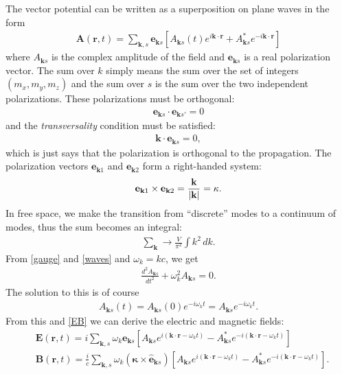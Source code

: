 \documentclass{book}
\theoremstyle{definition}
\newcommand{\f}[2]{\frac{#1}{#2}}
\newcommand{\lb}{\left[}
\newcommand{\rb}{\right]}
\begin{document}
The vector potential can be written as a superposition on plane waves in the form
\begin{align}
\mathbf{A}(\mathbf{r},t) = \sum_{\mathbf{k},s}\mathbf{e}_{\mathbf{k}s} \lb A_{\mathbf{k}s}(t)e^{i\mathbf{k}\cdot\mathbf{r}} + A_{\mathbf{k}s}^* e^{-i\mathbf{k}\cdot \mathbf{r}} \rb 
\end{align}
where $A_{\mathbf{k}s}$ is the complex amplitude of the field and $\mathbf{e}_{\mathbf{k}s}$ is a real polarization vector. The sum over $k$ simply means the sum over the set of integers $(m_x , m_y , m_z)$ and the sum over $s$ is the sum over the two independent polarizations. These polarizations must be orthogonal:
\begin{align}
\mathbf{e}_{\mathbf{k}s} \cdot \mathbf{e}_{\mathbf{k}s'} = 0
\end{align}
and the \textit{transversality} condition must be satisfied:
\begin{align}
\mathbf{k}\cdot\mathbf{e}_{\mathbf{k}s} = 0,
\end{align}
which is just says that the polarization is orthogonal to the propagation. The polarization vectors $\mathbf{e}_{\mathbf{k}1}$ and $\mathbf{e}_{\mathbf{k}2}$ form a right-handed system:
\begin{align}
\mathbf{e}_{\mathbf{k}1}\times \mathbf{e}_{\mathbf{k}2} = \f{\mathbf{k}}{\abs{\mathbf{k}}} = \mathbf{\kappa}.
\end{align}
In free space, we make the transition from ``discrete'' modes to a continuum of modes, thus the sum becomes an integral:
\begin{align}
\sum_{\mathbf{k}} \to \f{V}{\pi^2}\int k^2\,dk.
\end{align}
From \eqref{gauge} and \eqref{waves} and $\omega_k = kc$, we get
\begin{align}
\f{d^2 A_{\mathbf{k}s}}{dt^2} + \omega_k^2 A_{\mathbf{k}s} =0. 
\end{align}
The solution to this is of course
\begin{align}
A_{\mathbf{k}s}(t) = A_{\mathbf{k}s}(0)e^{-i\omega_k t} = A_{\mathbf{k}s}e^{-i\omega_k t}.
\end{align}
From this and \eqref{EB} we can derive the electric and magnetic fields:
\begin{align}
&\mathbf{E}(\mathbf{r},t) = i\sum_{\mathbf{k},s} \omega_k \mathbf{e}_{\mathbf{k}s} \lb A_{\mathbf{k}s}e^{i(\mathbf{k}\cdot\mathbf{r} - \omega_k t)} - A_{\mathbf{k}s}^* e^{-i(\mathbf{k}\cdot\mathbf{r} - \omega_k t)}\rb\\
&\mathbf{B}(\mathbf{r},t) = \f{i}{c}\sum_{\mathbf{k},s} \omega_k (\mathbf{\kappa} \times \hat{\mathbf{e}}_{\mathbf{k}s}) \lb A_{\mathbf{k}s}e^{i(\mathbf{k}\cdot\mathbf{r} - \omega_k t)} - A_{\mathbf{k}s}^* e^{-i(\mathbf{k}\cdot\mathbf{r} - \omega_k t)}\rb.
\end{align}
\end{document}
